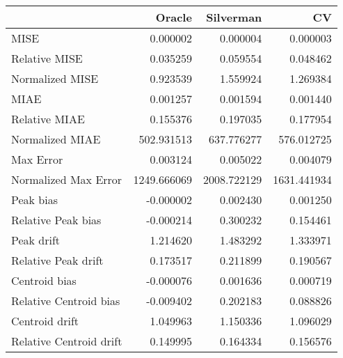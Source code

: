 \begin{tabular}{lrrr}
  \hline
 & Oracle & Silverman & CV \\ 
  \hline
MISE & 0.000002 & 0.000004 & 0.000003 \\ 
  Relative MISE & 0.035259 & 0.059554 & 0.048462 \\ 
  Normalized MISE & 0.923539 & 1.559924 & 1.269384 \\ 
  MIAE & 0.001257 & 0.001594 & 0.001440 \\ 
  Relative MIAE & 0.155376 & 0.197035 & 0.177954 \\ 
  Normalized MIAE & 502.931513 & 637.776277 & 576.012725 \\ 
  Max Error & 0.003124 & 0.005022 & 0.004079 \\ 
  Normalized Max Error & 1249.666069 & 2008.722129 & 1631.441934 \\ 
  Peak bias & -0.000002 & 0.002430 & 0.001250 \\ 
  Relative Peak bias & -0.000214 & 0.300232 & 0.154461 \\ 
  Peak drift & 1.214620 & 1.483292 & 1.333971 \\ 
  Relative Peak drift & 0.173517 & 0.211899 & 0.190567 \\ 
  Centroid bias & -0.000076 & 0.001636 & 0.000719 \\ 
  Relative Centroid bias & -0.009402 & 0.202183 & 0.088826 \\ 
  Centroid drift & 1.049963 & 1.150336 & 1.096029 \\ 
  Relative Centroid drift & 0.149995 & 0.164334 & 0.156576 \\ 
   \hline
\end{tabular}
